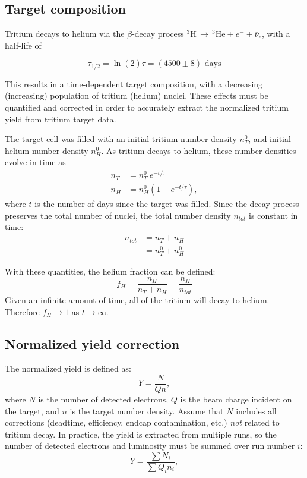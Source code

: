\subsection{Target composition}

Tritium decays to helium via the $\beta$-decay process $^3\text{H} \,\rightarrow\, ^3\text{He} + e^- + \overline{\nu}_e$, with a half-life of

\begin{equation*}
\tau_{1/2} = \ln(2)\tau = (4500 \pm 8) \text{ days} 
\end{equation*}

This results in a time-dependent target composition, with a decreasing (increasing) population of tritium (helium) nuclei.  These effects must be quantified and corrected in order to accurately extract the normalized tritium yield from tritium target data.

The target cell was filled with an initial tritium number density $n_T^0$, and initial helium number density $n_H^0$.  As tritium decays to helium, these number densities evolve in time as
\begin{align}
n_T &= n_T^0 \: e^{-t/\tau} \label{nT}\\[5pt]
n_H &= n_H^0(1 - e^{-t/\tau}) \label{nH},
\end{align}
where $t$ is the number of days since the target was filled.  Since the decay process preserves the total number of nuclei, the total number density $n_{tot}$ is constant in time:
\begin{align}
n_{tot} 	&= n_T + n_H \nonumber \\
		&= n_T^0 + n_H^0 
\end{align} 

With these quantities, the helium fraction can be defined:
\begin{equation}
f_H = \frac{n_H}{n_T + n_H} = \frac{n_H}{n_{tot}} \label{fH}
\end{equation}
Given an infinite amount of time, all of the tritium will decay to helium.  Therefore $f_H\rightarrow1$ as $t\rightarrow\infty$.  

\subsection{Normalized yield correction}

The normalized yield is defined as:
\begin{equation}
Y = \frac{N}{Qn},
\end{equation}
where $N$ is the number of detected electrons, $Q$ is the beam charge incident on the target, and $n$ is the target number density.  Assume that $N$ includes all corrections (deadtime, efficiency, endcap contamination, etc.) \textit{not} related to tritium decay.  In practice, the yield is extracted from multiple runs, so the number of detected electrons and luminosity must be summed over run number $i$:
\begin{equation}
Y = \frac{\sum N_i}{\sum Q_i n_i},
\end{equation}

